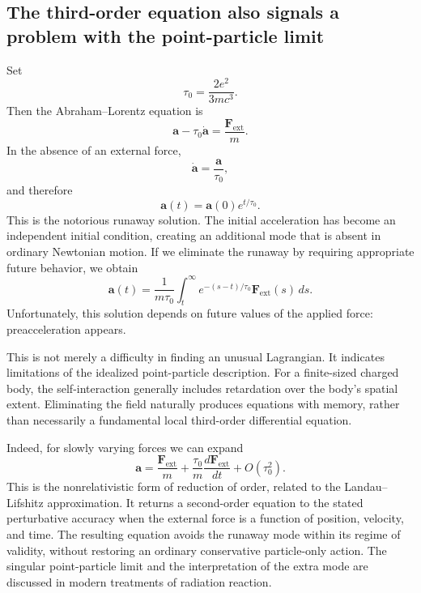 \subsection{ The third-order equation also signals a problem with the point-particle limit}
Set
\[
\tau_0=\frac{2e^2}{3mc^3}.
\]
Then the Abraham–Lorentz equation is
\[
\mathbf a-\tau_0\dot{\mathbf a}
=\frac{\mathbf F_{\mathrm{ext}}}{m}.
\]
In the absence of an external force,
\[
\dot{\mathbf a}=\frac{\mathbf a}{\tau_0},
\]
and therefore
\[
\mathbf a(t)=\mathbf a(0)e^{t/\tau_0}.
\]
This is the notorious runaway solution.
The initial acceleration has become an independent initial condition, creating
an additional mode that is absent in ordinary Newtonian motion.
If we eliminate the runaway by requiring appropriate future behavior, we obtain
\[
\mathbf a(t)
=
\frac{1}{m\tau_0}
\int_t^\infty
e^{-(s-t)/\tau_0}
\mathbf F_{\mathrm{ext}}(s)\,ds.
\]
Unfortunately, this solution depends on future values of the applied force:
preacceleration appears.

This is not merely a difficulty in finding an unusual Lagrangian.
It indicates limitations of the idealized point-particle description. For a
finite-sized charged body, the self-interaction generally includes retardation
over the body's spatial extent. Eliminating the field naturally produces
equations with memory, rather than necessarily a fundamental local third-order
differential equation.

Indeed, for slowly varying forces we can expand
\[
\mathbf a
=
\frac{\mathbf F_{\mathrm{ext}}}{m}
+\frac{\tau_0}{m}\frac{d\mathbf F_{\mathrm{ext}}}{dt}
+O(\tau_0^2).
\]
This is the nonrelativistic form of reduction of order, related to the
Landau–Lifshitz approximation. It returns a second-order equation to the stated
perturbative accuracy when the external force is a function of position,
velocity, and time.
The resulting equation avoids the runaway mode within its regime of validity,
without restoring an ordinary conservative particle-only action.
The singular point-particle limit and the interpretation of the extra mode are
discussed in modern treatments of radiation reaction. 

